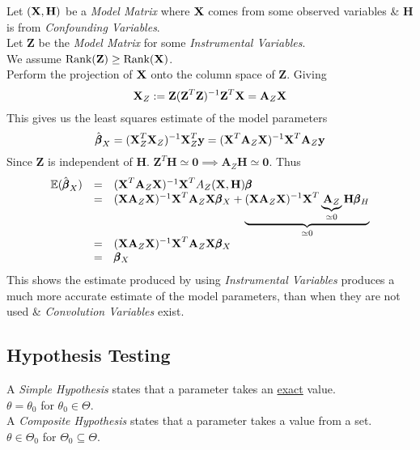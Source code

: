 \documentclass[11pt,a4paper]{article}
\begin{document}
Let $(\textbf{X},\textbf{H})$ be a \textit{Model Matrix} where $\textbf{X}$ comes from some observed variables \& $\textbf{H}$ is from \textit{Confounding Variables}.\\
Let $\textbf{Z}$ be the \textit{Model Matrix} for some \textit{Instrumental Variables}.\\
We assume $\text{Rank}(\textbf{Z})\geq\text{Rank}(\textbf{X})$.\\
Perform the projection of $\textbf{X}$ onto the column space of $\textbf{Z}$. Giving
$$\textbf{X}_Z:=\textbf{Z}(\textbf{Z}^T\textbf{Z})^{-1}\textbf{Z}^T\textbf{X}=\textbf{A}_Z\textbf{X}$$
This gives us the least squares estimate of the model parameters
$$\hat{\pmb\beta}_X=(\textbf{X}_Z^T\textbf{X}_Z)^{-1}\textbf{X}_Z^T\textbf{y}=(\textbf{X}^T\textbf{A}_Z\textbf{X})^{-1}\textbf{X}^T\textbf{A}_Z\textbf{y}$$
Since $\textbf{Z}$ is independent of $\textbf{H}$. $\textbf{Z}^T\textbf{H}\simeq\pmb0\implies\textbf{A}_Z\textbf{H}\simeq\pmb0$. Thus
\[\begin{array}{rcl}
\mathbb{E}(\hat{\pmb\beta}_X)&=&(\textbf{X}^T\textbf{A}_Z\textbf{X})^{-1}\textbf{X}^TA_Z(\textbf{X},\textbf{H})\pmb\beta\\
&=&(\textbf{X}\textbf{A}_Z\textbf{X})^{-1}\textbf{X}^T\textbf{A}_Z\textbf{X}\pmb\beta_X+\underbrace{(\textbf{X}\textbf{A}_Z\textbf{X})^{-1}\textbf{X}^T\underbrace{\textbf{A}_Z}_{\simeq0}\textbf{H}\pmb\beta_H}_{\simeq0}\\
&=&(\textbf{X}\textbf{A}_Z\textbf{X})^{-1}\textbf{X}^T\textbf{A}_Z\textbf{X}\pmb\beta_X\\
&=&\pmb\beta_X
\end{array}\]
This shows the estimate produced by using \textit{Instrumental Variables} produces a much more accurate estimate of the model parameters, than when they are not used \& \textit{Convolution Variables} exist.

\subsection{Hypothesis Testing}



A \textit{Simple Hypothesis} states that a parameter takes an \underline{exact} value.\\
\ie $\theta=\theta_0$ for $\theta_0\in\Theta$.\\

A \textit{Composite Hypothesis} states that a parameter takes a value from a set.\\
\ie $\theta\in\Theta_0$ for $\Theta_0\subseteq\Theta$.\\
\end{document}
